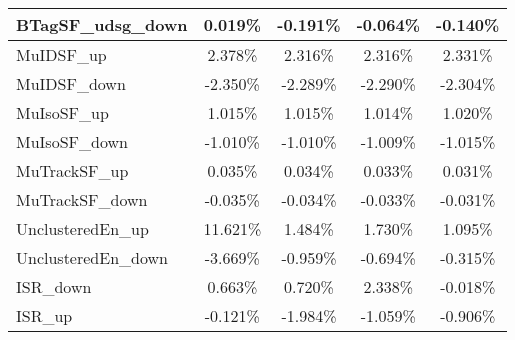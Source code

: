 \begin{table}[]
{\begin{tabular}{|l|c|c|c|c|}
BTagSF\_udsg\_down                          & 0.019\%                           & -0.191\%                           & -0.064\%                          & -0.140\%                           \\ \hline     
MuIDSF\_up                             & 2.378\%                              & 2.316\%                              & 2.316\%                             & 2.331\%                              \\ \hline    
MuIDSF\_down                           & -2.350\%                            & -2.289\%                            & -2.290\%                           & -2.304\%                            \\ \hline    
MuIsoSF\_up                            & 1.015\%                             & 1.015\%                             & 1.014\%                            & 1.020\%                             \\ \hline           
MuIsoSF\_down                          & -1.010\%                           & -1.010\%                           & -1.009\%                          & -1.015\%                           \\ \hline    
MuTrackSF\_up                          & 0.035\%                           & 0.034\%                           & 0.033\%                          & 0.031\%                           \\ \hline    
MuTrackSF\_down                        & -0.035\%                         & -0.034\%                         & -0.033\%                        & -0.031\%                         \\ \hline  
UnclusteredEn\_up                         & 11.621\%                          & 1.484\%                          & 1.730\%                         & 1.095\%                          \\ \hline    
UnclusteredEn\_down                      & -3.669\%                         & -0.959\%                        & -0.694\%                       & -0.315\%                        \\ \hline   \hline 
ISR\_down                                & 0.663\%                                   & 0.720\%                                  & 2.338\%                                 & -0.018\%                                  \\ \hline
ISR\_up                                  & -0.121\%                                     & -1.984\%                                    & -1.059\%                                   & -0.906\%                                    \\ \hline

\end{tabular}}
\end{table}

